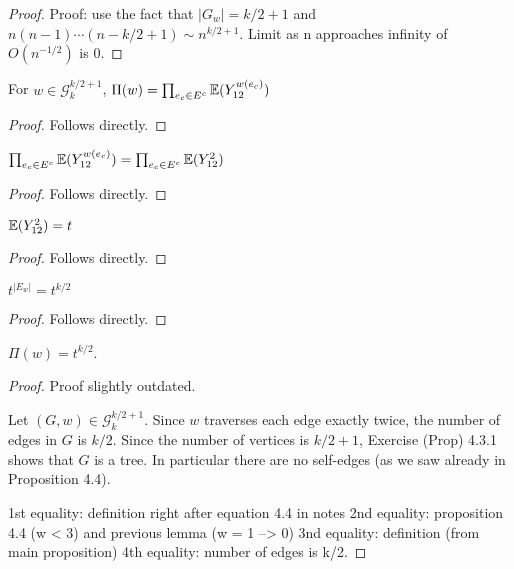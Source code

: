 \begin{proof}
  \notready
  Proof: use the fact that $|G_w|=k/2+1$ and $n(n-1)\cdots(n-k/2+1) \sim n^{k/2+1}$. Limit as n approaches infinity of $O(n^{-1/2})$ is 0.
\end{proof}


\begin{lemma}
  \label{lem:prod_expansion}
  \notready
  For $w\in\mathcal{G}^{k/2+1}_k$, $\Pi(w) = \prod_{e_c\in E^c} \mathbb{E}(Y_{12}^{w(e_c)})$
\end{lemma}

\begin{proof}
  \notready
  Follows directly.
\end{proof}


\begin{lemma}
  \label{lem:w_2_case}
  \notready
  $\prod_{e_c\in E^c} \mathbb{E}(Y_{12}^{w(e_c)}) = \prod_{e_c\in E^c} \mathbb{E}(Y_{12}^2)$
\end{lemma}

\begin{proof}
  \notready
  Follows directly.
\end{proof}


\begin{lemma}
  \label{lem:def_t_rewrite}
  \notready
  \uses{}
  $\mathbb{E}(Y_{12}^2) = t$
\end{lemma}

\begin{proof}
  \notready
  Follows directly.
\end{proof}


\begin{lemma}
  \label{lem:e_equals_k_over_two}
  \notready
  $t^{|E_w|} = t^{k/2}$
\end{lemma}

\begin{proof}
  \notready
  Follows directly.
\end{proof}


\begin{proposition}%
  \label{prop:product_g_w_to_exponential}
  \notready
  $\Pi(w) = t^{k/2}$.
\end{proposition}

\begin{proof}
  \notready
  Proof slightly outdated.

  Let $(G,w)\in\mathcal{G}^{k/2+1}_k$.  Since $w$ traverses each edge exactly twice, the number of edges in $G$ is $k/2$.  Since the number of vertices is $k/2+1$, Exercise (Prop) 4.3.1 shows that $G$ is a tree.  In particular there are no self-edges (as we saw already in Proposition 4.4).

  1st equality: definition right after equation 4.4 in notes
  2nd equality: proposition 4.4 (w < 3) and previous lemma (w = 1 --> 0)
  3nd equality: definition (from main proposition)
  4th equality: number of edges is k/2.
\end{proof}



